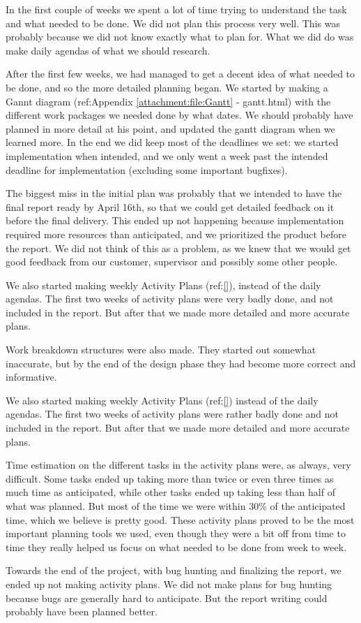 In the first couple of weeks we spent a lot of time trying to understand the task and what needed to be done. We did not plan this process very well. This was probably because we did not know exactly what to plan for. What we did do was make daily agendas of what we should research.

After the first few weeks, we had managed to get a decent idea of what needed to be done, and so the more detailed planning began. We started by making a Gannt diagram (ref:Appendix \ref{attachment:file:Gantt} - gantt.html) with the different work packages we needed done by what dates. We should probably have planned in more detail at his point, and updated the gantt diagram when we learned more. In the end we did keep most of the deadlines we set: we started implementation when intended, and we only went a week past the intended deadline for implementation (excluding some important bugfixes). 

The biggest miss in the initial plan was probably that we intended to have the final report ready by April 16th, so that we could get detailed feedback on it before the final delivery. This ended up not happening because implementation required more resources than anticipated, and we prioritized the product before the report. We did not think of this as a problem, as we knew that we would get good feedback from our customer, supervisor and possibly some other people.

We also started making weekly Activity Plans (ref:\ref{}), instead of the daily agendas. The first two weeks of activity plans were very badly done, and not included in the report. But after that we made more detailed and more accurate plans.

Work breakdown structures were also made. They started out somewhat inaccurate, but by the end of the design phase they had become more correct and informative. 

We also started making weekly Activity Plans (ref:\ref{}) instead of the daily agendas. The first two weeks of activity plans were rather badly done and not included in the report. But after that we made more detailed and more accurate plans.

Time estimation on the different tasks in the activity plans were, as always, very difficult. Some tasks ended up taking more than twice or even three times as much time as anticipated, while other tasks ended up taking less than half of what was planned. But most of the time we were within 30\% of the anticipated time, which we believe is pretty good. These activity plans proved to be the most important planning tools we used, even though they were a bit off from time to time they really helped us focus on what needed to be done from week to week.

Towards the end of the project, with bug hunting and finalizing the report, we ended up not making activity plans. We did not make plans for bug hunting because bugs are generally hard to anticipate. But the report writing could probably have been planned better.
